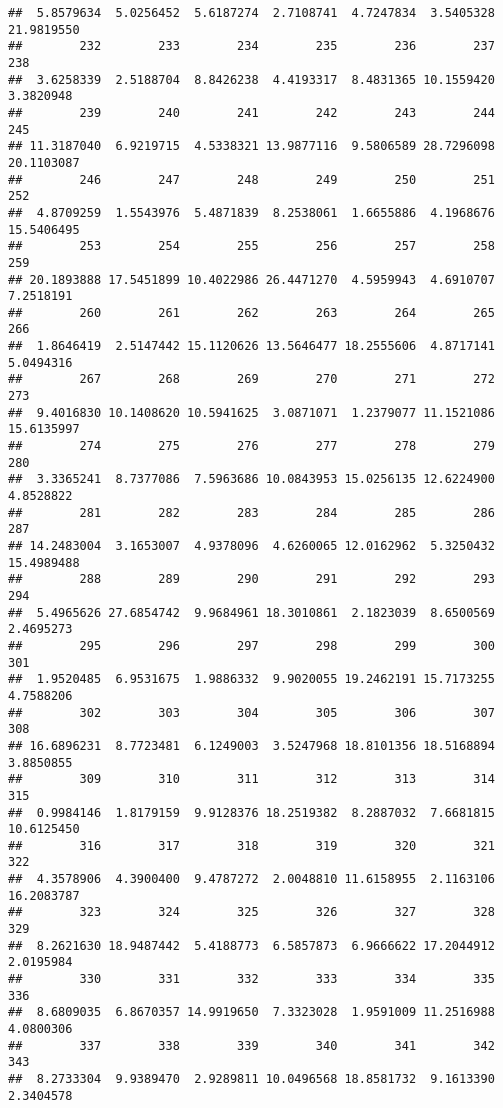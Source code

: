 \documentclass[
]{article}
\begin{document}
\begin{verbatim}
##  5.8579634  5.0256452  5.6187274  2.7108741  4.7247834  3.5405328 21.9819550 
##        232        233        234        235        236        237        238 
##  3.6258339  2.5188704  8.8426238  4.4193317  8.4831365 10.1559420  3.3820948 
##        239        240        241        242        243        244        245 
## 11.3187040  6.9219715  4.5338321 13.9877116  9.5806589 28.7296098 20.1103087 
##        246        247        248        249        250        251        252 
##  4.8709259  1.5543976  5.4871839  8.2538061  1.6655886  4.1968676 15.5406495 
##        253        254        255        256        257        258        259 
## 20.1893888 17.5451899 10.4022986 26.4471270  4.5959943  4.6910707  7.2518191 
##        260        261        262        263        264        265        266 
##  1.8646419  2.5147442 15.1120626 13.5646477 18.2555606  4.8717141  5.0494316 
##        267        268        269        270        271        272        273 
##  9.4016830 10.1408620 10.5941625  3.0871071  1.2379077 11.1521086 15.6135997 
##        274        275        276        277        278        279        280 
##  3.3365241  8.7377086  7.5963686 10.0843953 15.0256135 12.6224900  4.8528822 
##        281        282        283        284        285        286        287 
## 14.2483004  3.1653007  4.9378096  4.6260065 12.0162962  5.3250432 15.4989488 
##        288        289        290        291        292        293        294 
##  5.4965626 27.6854742  9.9684961 18.3010861  2.1823039  8.6500569  2.4695273 
##        295        296        297        298        299        300        301 
##  1.9520485  6.9531675  1.9886332  9.9020055 19.2462191 15.7173255  4.7588206 
##        302        303        304        305        306        307        308 
## 16.6896231  8.7723481  6.1249003  3.5247968 18.8101356 18.5168894  3.8850855 
##        309        310        311        312        313        314        315 
##  0.9984146  1.8179159  9.9128376 18.2519382  8.2887032  7.6681815 10.6125450 
##        316        317        318        319        320        321        322 
##  4.3578906  4.3900400  9.4787272  2.0048810 11.6158955  2.1163106 16.2083787 
##        323        324        325        326        327        328        329 
##  8.2621630 18.9487442  5.4188773  6.5857873  6.9666622 17.2044912  2.0195984 
##        330        331        332        333        334        335        336 
##  8.6809035  6.8670357 14.9919650  7.3323028  1.9591009 11.2516988  4.0800306 
##        337        338        339        340        341        342        343 
##  8.2733304  9.9389470  2.9289811 10.0496568 18.8581732  9.1613390  2.3404578 

\end{verbatim}
\end{document}
